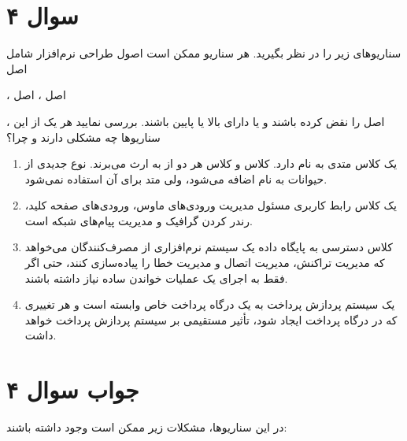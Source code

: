 \section*{سوال ۴}

سناریوهای زیر را در نظر بگیرید. هر سناریو ممکن است اصول طراحی نرم‌افزار شامل اصل

، اصل
، اصل

، اصل
را نقض کرده باشند و یا دارای
بالا یا
پایین باشند. بررسی نمایید هر یک از این سناریوها چه مشکلی دارند و چرا؟

\begin{enumerate}
	\item یک کلاس  متدی به نام  دارد. کلاس  و کلاس  هر دو از  به ارث می‌برند. نوع جدیدی از حیوانات به نام  اضافه می‌شود، ولی متد  برای آن استفاده نمی‌شود.
	\item یک کلاس رابط کاربری مسئول مدیریت ورودی‌های ماوس، ورودی‌های صفحه کلید، رندر کردن گرافیک و مدیریت پیام‌های شبکه است.
	\item کلاس دسترسی به پایگاه داده یک سیستم نرم‌افزاری از مصرف‌کنندگان می‌خواهد که مدیریت تراکنش، مدیریت اتصال و مدیریت خطا را پیاده‌سازی کنند، حتی اگر فقط به اجرای یک عملیات خواندن ساده نیاز داشته باشند.
	\item یک سیستم پردازش پرداخت به یک درگاه پرداخت خاص وابسته است و هر تغییری که در درگاه پرداخت ایجاد شود، تأثیر مستقیمی بر سیستم پردازش پرداخت خواهد داشت.
\end{enumerate}

\section*{جواب سوال ۴}

در این سناریوها، مشکلات زیر ممکن است وجود داشته باشند:

